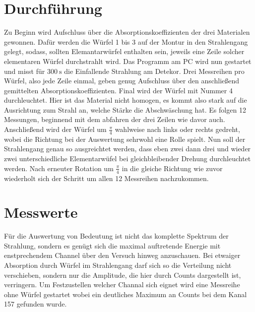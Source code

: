 \section{Durchführung}
Zu Beginn wird Aufschluss über die Absorptionskoeffizienten der drei Materialen gewonnen. 
Dafür werden die Würfel 1 bis 3 auf der Montur in den Strahlengang gelegt, sodass, sollten Elemantarwürfel enthalten sein, jeweils eine Zeile solcher elementaren Würfel 
durchstrahlt wird. Das Programm am PC wird nun gestartet und misst für $\SI{300}{\second}$ die Einfallende Strahlung am Detekor. Drei Messreihen pro Würfel, also jede Zeile einmal, geben genug Aufschluss über den anschließend gemittelten Absorptionskoeffizienten.
Final wird der Würfel mit Nummer 4 durchleuchtet. Hier ist das Material nicht homogen, es kommt also stark auf die Ausrichtung zum Strahl an, welche Stärke
die Abschwäschung hat. Es folgen 12 Messungen, beginnend mit dem abfahren der drei Zeilen wie davor auch. Anschließend wird der Würfel um 
$\frac{\pi}{4}$ wahlweise nach links oder rechts gedreht, wobei die Richtung bei der Auswertung sehrwohl eine Rolle spielt.
Nun soll der Strahlengang genau so ausgreichtet werden, dass eben zwei dann drei und wieder zwei unterschiedliche Elementarwüfel bei gleichbleibender Drehung
durchleuchtet werden. Nach erneuter Rotation um $\frac{\pi}{4}$ in die gleiche Richtung wie zuvor wiederholt sich der Schritt um 
allen 12 Messreihen nachzukommen.

\section{Messwerte}
Für die Auswertung von Bedeutung ist nicht das komplette Spektrum der Strahlung, sondern es genügt sich die maximal auftretende Energie mit enstprechendem
Channel über den Versuch hinweg anzuschauen. Bei etwaiger Absorption durch Würfel im Strahlengang darf sich so die Verteilung nicht verschieben, sondern 
nur die Amplitude, die hier durch Counts dargestellt ist, verringern.
Um Festzustellen welcher Channal sich eignet wird eine Messreihe ohne Würfel gestartet wobei ein deutliches Maximum  an Counts bei dem Kanal 157 gefunden wurde.


